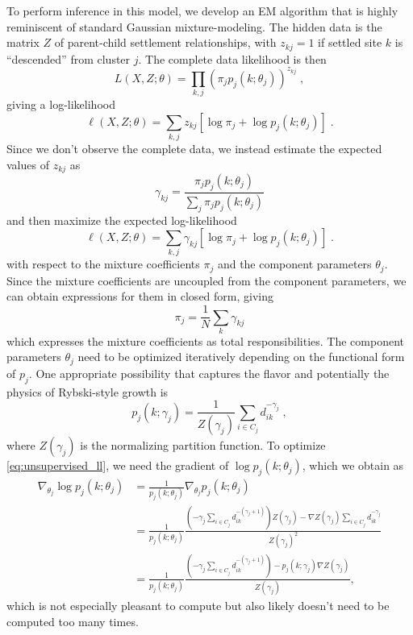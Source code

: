 \documentclass[english]{scrartcl}
\begin{document}
	To perform inference in this model, we develop an EM algorithm that is highly reminiscent of standard Gaussian mixture-modeling. 
	The hidden data is the matrix $Z$ of parent-child settlement relationships, with $z_{kj} = 1$ if settled site $k$ is ``descended'' from cluster $j$. 
	The complete data likelihood is then 
	\begin{equation}
		L(X, Z;\theta) = \prod_{k, j} (\pi_{j} p_j(k;\theta_j))^{z_{kj}}\;,
	\end{equation}
	giving a log-likelihood 
	\begin{equation}
		\ell(X,Z;\theta) = \sum_{k, j} z_{kj} \left[\log \pi_{j} + \log p_j(k;\theta_j) \right]\;.
	\end{equation}
	Since we don't observe the complete data, we instead estimate the expected values of $z_{kj}$ as 
	\begin{equation}
		\gamma_{kj} = \frac{\pi_{j} p_j(k;\theta_j)}{\sum_j \pi_{j} p_j(k;\theta_j)}
	\end{equation}
	and then maximize the expected log-likelihood 
	\begin{equation}
		\ell(X,Z;\theta) = \sum_{k, j} \gamma_{kj} \left[\log \pi_{j} + \log p_j(k;\theta_j) \right]\;. \label{eq:unsupervised_ll}
	\end{equation}
	with respect to the mixture coefficients $\pi_j$ and the component parameters $\theta_j$. 
	Since the mixture coefficients are uncoupled from the component parameters, we can obtain expressions for them in closed form, giving 
	\begin{equation}
		\pi_j = \frac{1}{N} \sum_{k} \gamma_{kj}
	\end{equation}
	which expresses the mixture coefficients as total responsibilities. 
	The component parameters $\theta_j$ need to be optimized iteratively depending on the functional form of $p_j$. 
	One appropriate possibility that captures the flavor and potentially the physics of Rybski-style growth is 
	\begin{equation}
		p_j(k;\gamma_j) = \frac{1}{Z(\gamma_j)}\sum_{i \in C_j}d_{ik}^{-\gamma_j}\;,
	\end{equation}
	where $Z(\gamma_j)$ is the normalizing partition function. 
	To optimize \eqref{eq:unsupervised_ll}, we need the gradient of $\log p_j(k;\theta_j)$, which we obtain as 
	\begin{align}
		\nabla_{\theta_j} \log p_j(k;\theta_j) &= \frac{1}{p_j(k;\theta_j)}\nabla_{\theta_j} p_j(k;\theta_j) \\ 
		&= \frac{1}{p_j(k;\theta_j)}  \frac{\left(-\gamma_j\sum_{i \in C_j}d_{ik}^{-(\gamma_j + 1)}\right) Z(\gamma_j) - \nabla Z(\gamma_j) \sum_{i \in C_j}d_{ik}^{-\gamma_j}  }{Z(\gamma_j)^2} \\ 
		&= \frac{1}{p_j(k;\theta_j)}  \frac{\left(-\gamma_j\sum_{i \in C_j}d_{ik}^{-(\gamma_j + 1)}\right) - p_j(k;\gamma_j)\nabla Z(\gamma_j)   }{Z(\gamma_j)},
	\end{align}
	which is not especially pleasant to compute but also likely doesn't need to be computed too many times. 
\end{document}
